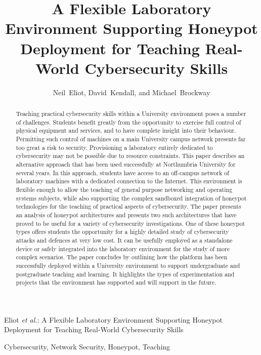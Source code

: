 \documentclass[10pt,journal]{IEEEtran}
\begin{document}
\title{A Flexible Laboratory Environment Supporting Honeypot Deployment for 
Teaching Real-World Cybersecurity Skills
}


\author{Neil~Eliot, 
        David~Kendall, 
        and Michael~Brockway}


%
{Eliot \MakeLowercase{\textit{et al.}}: A Flexible Laboratory Environment Supporting Honeypot Deployment for Teaching Real-World Cybersecurity Skills}

\maketitle

\begin{abstract}
  Teaching practical cybersecurity skills within a University environment poses
  a number of challenges. Students benefit greatly from the opportunity to
  exercise full control of physical equipment and services, and to have
  complete insight into their behaviour. Permitting such control of machines on
  a main University campus network presents far too great a risk to security.
  Provisioning a laboratory entirely dedicated to cybersecurity may not be
  possible due to resource constraints. This paper describes an alternative
  approach that has been used successfully at Northumbria University for
  several years. In this approach, students have access to an off-campus
  network of laboratory machines with a dedicated connection to the Internet.
  This environment is flexible enough to allow the teaching of general purpose
  networking and operating systems subjects, while also supporting the complex
  sandboxed integration of honeypot technologies for the teaching of practical
  aspects of cybersecurity. The paper presents an analysis of honeypot
  architectures and presents two such architectures that have proved to be
  useful for a variety of cybersecurity investigations.  One of these honeypot
  types offers students the opportunity for a highly detailed study of
  cybersecurity attacks and defences at very low cost. It can be usefully
  employed as a standalone device or safely integrated into the laboratory
  environment for the study of more complex scenarios.  The paper concludes by
  outlining how the platform has been successfully deployed within a University
  environment to support undergraduate and postgraduate teaching and learning.
  It highlights the types of experimentation and projects that the environment
  has supported and will support in the future.
\end{abstract}
\begin{IEEEkeywords}
  Cybersecurity, Network Security, Honeypot, Teaching
\end{IEEEkeywords}
\end{document}

